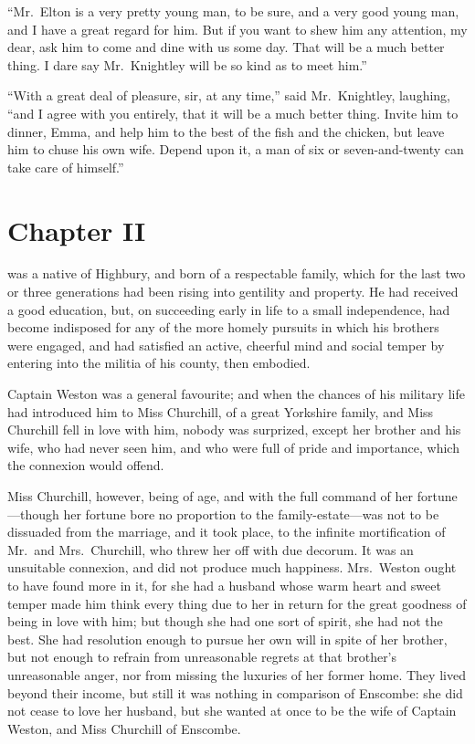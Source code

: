 ``Mr.\ Elton is a very pretty young man, to be sure, and a very
good young man, and I have a great regard for him.  But if you
want to shew him any attention, my dear, ask him to come
and dine with us some day.  That will be a much better thing.
I dare say Mr.\ Knightley will be so kind as to meet him.''

``With a great deal of pleasure, sir, at any time,'' said Mr.\ Knightley,
laughing, ``and I agree with you entirely, that it will be a much
better thing.  Invite him to dinner, Emma, and help him to the best
of the fish and the chicken, but leave him to chuse his own wife.
Depend upon it, a man of six or seven-and-twenty can take care
of himself.''



\chapter{Chapter II}


 was a native of Highbury, and born of a respectable family,
which for the last two or three generations had been rising into
gentility and property.  He had received a good education, but,
on succeeding early in life to a small independence, had become
indisposed for any of the more homely pursuits in which his brothers
were engaged, and had satisfied an active, cheerful mind and social
temper by entering into the militia of his county, then embodied.

Captain Weston was a general favourite; and when the chances
of his military life had introduced him to Miss Churchill,
of a great Yorkshire family, and Miss Churchill fell in love
with him, nobody was surprized, except her brother and his wife,
who had never seen him, and who were full of pride and importance,
which the connexion would offend.

Miss Churchill, however, being of age, and with the full command
of her fortune---though her fortune bore no proportion to the
family-estate---was not to be dissuaded from the marriage, and it
took place, to the infinite mortification of Mr.\ and Mrs.\ Churchill,
who threw her off with due decorum.  It was an unsuitable connexion,
and did not produce much happiness.  Mrs.\ Weston ought to have found
more in it, for she had a husband whose warm heart and sweet temper
made him think every thing due to her in return for the great goodness
of being in love with him; but though she had one sort of spirit,
she had not the best.  She had resolution enough to pursue
her own will in spite of her brother, but not enough to refrain
from unreasonable regrets at that brother's unreasonable anger,
nor from missing the luxuries of her former home.  They lived beyond
their income, but still it was nothing in comparison of Enscombe:
she did not cease to love her husband, but she wanted at once
to be the wife of Captain Weston, and Miss Churchill of Enscombe.

